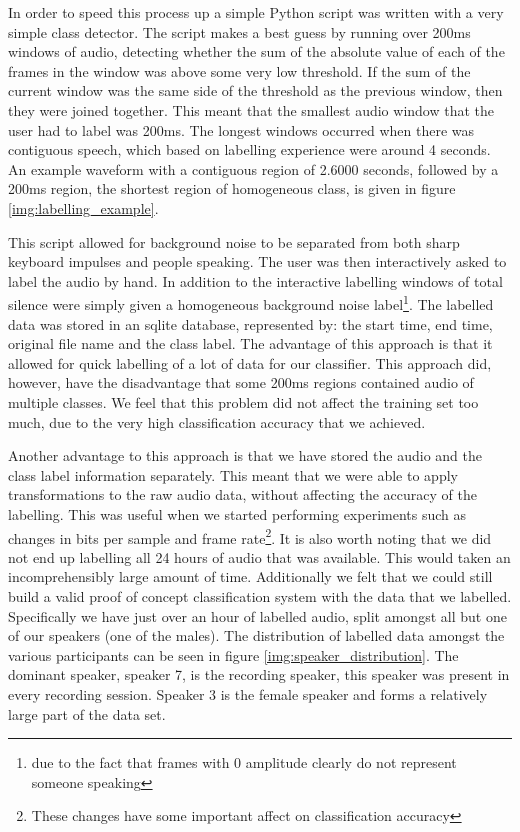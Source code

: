 \documentclass[ %
                    author={Sam Phippen},
                supervisor={Dr. Rafal Bogacz},
                     title={Real time voice activity detectors in noisy personal computing environments},
                  subtitle={},
                    degree={MEng},
                      year={2012} ]{thesis}
\begin{document}
In order to speed this process up a simple Python script was written with a
very simple class detector. The script makes a best guess by running over
200ms windows of audio, detecting whether the sum of the absolute value of each
of the frames in the window was above some very low threshold. If the sum of
the current window was the same side of the threshold as the previous window,
then they were joined together. This meant that the smallest audio window that
the user had to label was 200ms. The longest windows occurred when there was
contiguous speech, which based on labelling experience were around 4 seconds.
An example waveform with a contiguous region of 2.6000 seconds, followed by a
200ms region, the shortest region of homogeneous class, is given in figure
\ref{img:labelling_example}.

This script allowed for background noise to be separated from both sharp
keyboard impulses and people speaking. The user was then interactively asked to
label the audio by hand. In addition to the interactive labelling windows of
total silence were simply given a homogeneous background noise
label\footnote{due to the fact that frames with 0 amplitude clearly do not
represent someone speaking}. The labelled data was stored in an sqlite
database, represented by: the start time, end time, original file name and the
class label. The advantage of this approach is that it allowed for quick
labelling of a lot of data for our classifier. This approach did, however, have
the disadvantage that some 200ms regions contained audio of multiple classes.
We feel that this problem did not affect the training set too much, due to the
very high classification accuracy that we achieved.

Another advantage to this approach is that we have stored the audio and the
class label information separately. This meant that we were able to apply
transformations to the raw audio data, without affecting the accuracy of the
labelling. This was useful when we started performing experiments such as
changes in bits per sample and frame rate\footnote{These changes have some
important affect on classification accuracy}. It is also worth noting that we
did not end up labelling all 24 hours of audio that was available. This would
taken an incomprehensibly large amount of time. Additionally we felt that we
could still build a valid proof of concept classification system with the data
that we labelled. Specifically we have just over an hour of labelled audio,
split amongst all but one of our speakers (one of the males). The distribution
of labelled data amongst the various participants can be seen in figure
\ref{img:speaker_distribution}. The dominant speaker, speaker 7, is the
recording speaker, this speaker was present in every recording session. Speaker
3 is the female speaker and forms a relatively large part of the data set.
\end{document}
